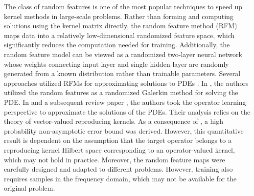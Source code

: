 \documentclass[11pt,twoside]{article}
\theoremstyle{plain}
\theoremstyle{definition}
\theoremstyle{remark}
\begin{document}
The class of random features is one of the most popular techniques to speed up kernel methods in large-scale problems. Rather than forming and computing solutions using the kernel matrix directly, the random feature method (RFM) \cite{Rahimi2007RFM, Rahimi2008RFM} maps data into a relatively low-dimensional randomized feature space, which significantly reduces the computation needed for training. 
Additionally, the random feature model can be viewed as a randomized two-layer neural network whose weights connecting input layer and single hidden layer are randomly generated from a known distribution rather than trainable parameters. 
Several approaches utilized RFMs for approximating solutions to PDEs \cite{chen2022RFM, nelson2021random, Nelson2024operatorRFM}. 
In \cite{chen2022RFM}, the authors utilized the random features as a randomized Galerkin method for solving the PDE. 
In \cite{nelson2021random} and a subsequent review paper \cite{Nelson2024operatorRFM}, the authors took the operator learning perspective to approximate the solutions of the PDEs. 
Their analysis relies on the theory of vector-valued reproducing kernels. As a consequence of \cite{lanthaler2023error}, a high probability non-asymptotic error bound was derived. 
However, this quantitative result is dependent on the assumption that the target operator belongs to a reproducing kernel Hilbert space corresponding to an operator-valued kernel, which may not hold in practice. 
Moreover, the random feature maps were carefully designed and adapted to different problems. However, training also requires samples in the frequency domain, which may not be available for the original problem.
\end{document}
